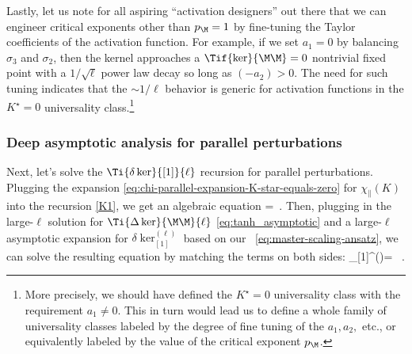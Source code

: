 Lastly, let us note for all aspiring ``activation designers'' out there that we can engineer critical exponents other than $p_\M = 1$ by fine-tuning the Taylor coefficients of the activation function. For example, if we set $a_1=0$ by balancing $\sigma_3$ and $\sigma_2$, then the kernel approaches a $\Tif{\ker}{\M\M}=0$ nontrivial fixed point with a $ 1/\sqrt{\ell}$ power law decay so long as $(-a_2)>0$.
The need for such tuning indicates that the $\sim 1/\ell$ behavior is generic for activation functions in the $K^\star=0$ universality class.\footnote{
    More precisely, we should have defined the $K^\star=0$ universality class with the requirement $a_1\neq0$. This in turn would lead us to define a whole family of universality classes labeled by the degree of fine tuning of the $a_1, a_2,$ etc., or equivalently labeled by the value of the critical exponent $p_\M$. %
}  %



\subsubsection{Deep asymptotic analysis for parallel perturbations}
Next, let's solve the $\Ti{\delta\ker}{[1]}{\ell}$ recursion for parallel perturbations. 
Plugging the expansion \eqref{eq:chi-parallel-expansion-K-star-equals-zero} for $\chi_\parallel(K)$ into the recursion \eqref{K1}, we get an algebraic equation
\be\label{eq:parallel-agebraic}
=\Ti{\delta \ker}{[1]}{\ell}\, .
\ee
Then, plugging in the large-$\ell$ solution for $\Ti{\Delta\ker}{\M\M}{\ell}$ \eqref{eq:tanh_asymptotic}
and a large-$\ell$ asymptotic expansion for $\delta \ker_{[1]}^{(\ell)}$ based on our ~\eqref{eq:master-scaling-ansatz}, we can solve
the resulting equation by matching the terms on both sides:
\be
\delta \ker_{[1]}^{(\ell)}= \, .
\ee


